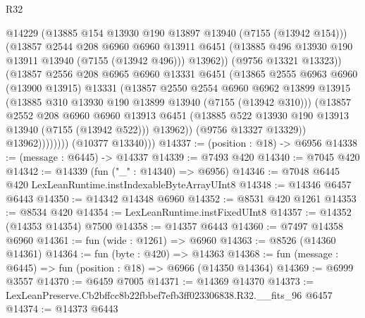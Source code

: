 \begin{lexlean}{R32}
\begin{coremodule}
                          @14229
                          (@13885 @154 @13930 @190 @13897 @13940 (@7155 (@13942 @154)))
                          (@13857
                            @2544
                            @208
                            @6960
                            @6960
                            @13911
                            @6451
                            (@13885 @496 @13930 @190 @13911 @13940 (@7155 (@13942 @496)))
                            @13962))
                        (@9756 @13321 @13323))
                      (@13857
                        @2556
                        @208
                        @6965
                        @6960
                        @13331
                        @6451
                        (@13865
                          @2555
                          @6963
                          @6960
                          (@13900 @13915)
                          @13331
                          (@13857
                            @2550
                            @2554
                            @6960
                            @6962
                            @13899
                            @13915
                            (@13885 @310 @13930 @190 @13899 @13940 (@7155 (@13942 @310)))
                            (@13857
                              @2552
                              @208
                              @6960
                              @6960
                              @13913
                              @6451
                              (@13885 @522 @13930 @190 @13913 @13940 (@7155 (@13942 @522)))
                              @13962))
                          (@9756 @13327 @13329))
                        @13962))))))))
        (@10377 @13340)))
@14337 := (position : @18) -> @6956
@14338 := (message : @6445) -> @14337
@14339 := @7493 @420
@14340 := @7045 @420
@14342 := @14339 (fun ("_" : @14340) => @6956)
@14346 := @7048 @6445 @420 LexLeanRuntime.instIndexableByteArrayUInt8
@14348 := @14346 @6457 @6443
@14350 := @14342 @14348 @6960
@14352 := @8531 @420 @1261
@14353 := @8534 @420
@14354 := LexLeanRuntime.instFixedUInt8
@14357 := @14352 (@14353 @14354) @7500
@14358 := @14357 @6443
@14360 := @7497 @14358 @6960
@14361 := fun (wide : @1261) => @6960
@14363 := @8526 (@14360 @14361)
@14364 := fun (byte : @420) => @14363
@14368 := fun (message : @6445) => fun (position : @18) => @6966 (@14350 @14364)
@14369 := @6999 @3557
@14370 := @6459 @7005
@14371 := @14369 @14370
@14373 := LexLeanPreserve.Cb2bffcc8b22fbbef7efb3ff023306838.R32.__fits_96 @6457
@14374 := @14373 @6443

\end{coremodule}
\end{lexlean}
